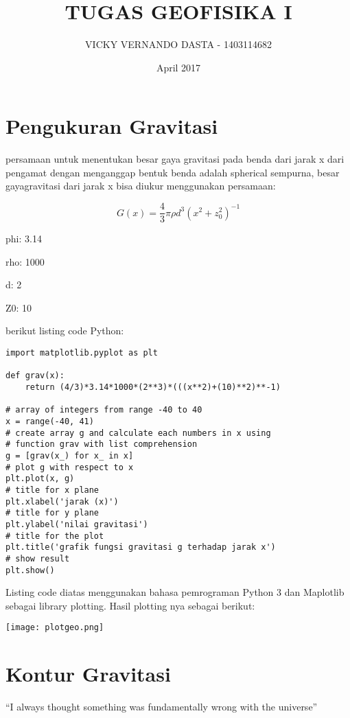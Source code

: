 \documentclass{article}
\title{TUGAS GEOFISIKA I}
\author{VICKY VERNANDO DASTA - 1403114682}
\date{April 2017}
\begin{document}
\maketitle

\section{Pengukuran Gravitasi}

persamaan untuk menentukan besar gaya gravitasi pada benda dari jarak x dari pengamat 
dengan menganggap bentuk benda adalah spherical sempurna, besar gayagravitasi dari jarak x bisa diukur menggunakan persamaan:


$$G(x)=\frac{4}{3}{\pi}{\rho}{d^{3}}{(x^{2} + z_{0}^{2})^{-1}} $$


phi: 3.14

rho: 1000 

d: 2

Z0: 10


berikut listing code Python:

\begin{lstlisting}
import matplotlib.pyplot as plt

def grav(x):
    return (4/3)*3.14*1000*(2**3)*(((x**2)+(10)**2)**-1)

# array of integers from range -40 to 40
x = range(-40, 41)
# create array g and calculate each numbers in x using 
# function grav with list comprehension
g = [grav(x_) for x_ in x]
# plot g with respect to x
plt.plot(x, g)
# title for x plane
plt.xlabel('jarak (x)')
# title for y plane
plt.ylabel('nilai gravitasi')
# title for the plot
plt.title('grafik fungsi gravitasi g terhadap jarak x')
# show result
plt.show()
\end{lstlisting}



Listing code diatas menggunakan bahasa pemrograman Python 3 dan Maplotlib sebagai library plotting. Hasil plotting nya sebagai berikut:

\texttt{[image: plotgeo.png]}

\section{Kontur Gravitasi}
``I always thought something was fundamentally wrong with the universe'' \citep{adams1995hitchhiker}



\end{document}
